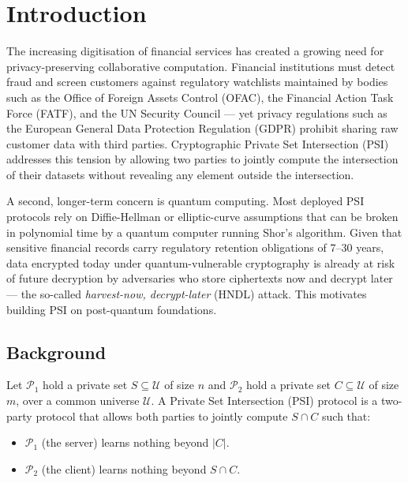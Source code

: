 \chapter{Introduction}

The increasing digitisation of financial services has created a growing need for
privacy-preserving collaborative computation. Financial institutions must detect fraud
and screen customers against regulatory watchlists maintained by bodies such as the
Office of Foreign Assets Control (OFAC), the Financial Action Task Force (FATF), and
the UN Security Council --- yet privacy regulations such as the European General Data
Protection Regulation (GDPR) prohibit sharing raw customer data with third parties.
Cryptographic Private Set Intersection (PSI) addresses this tension by allowing two
parties to jointly compute the intersection of their datasets without revealing any
element outside the intersection.

A second, longer-term concern is quantum computing. Most deployed PSI protocols rely
on Diffie-Hellman or elliptic-curve assumptions that can be broken in polynomial time
by a quantum computer running Shor's algorithm. Given that sensitive financial records
carry regulatory retention obligations of 7--30 years, data encrypted today under
quantum-vulnerable cryptography is already at risk of future decryption by adversaries
who store ciphertexts now and decrypt later --- the so-called \textit{harvest-now,
decrypt-later} (HNDL) attack. This motivates building PSI on post-quantum foundations.

\section{Background}

\begin{definition}\label{def:psi}
Let $\mathcal{P}_1$ hold a private set $S \subseteq \mathcal{U}$ of size $n$ and
$\mathcal{P}_2$ hold a private set $C \subseteq \mathcal{U}$ of size $m$, over a
common universe $\mathcal{U}$. A Private Set Intersection (PSI) protocol is a
two-party protocol that allows both parties to jointly compute $S \cap C$ such that:
\begin{itemize}
    \item $\mathcal{P}_1$ (the server) learns nothing beyond $|C|$.
    \item $\mathcal{P}_2$ (the client) learns nothing beyond $S \cap C$.
\end{itemize}
\end{definition}

